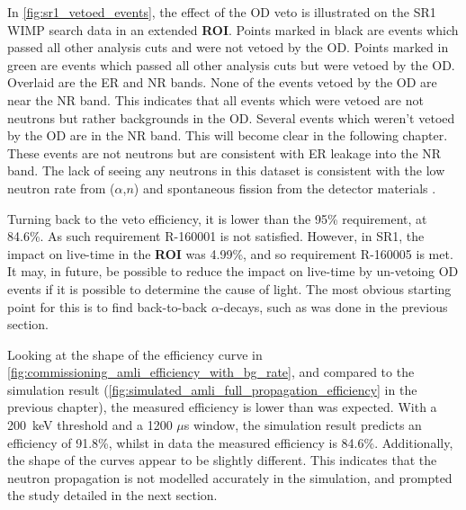 
%



\par
In \autoref{fig:sr1_vetoed_events}, the effect of the OD veto is illustrated on the SR1 WIMP search data in an extended \textbf{ROI}.
Points marked in black are events which passed all other analysis cuts and were not vetoed by the OD.
Points marked in green are events which passed all other analysis cuts but were vetoed by the OD.
Overlaid are the ER and NR bands.
None of the events vetoed by the OD are near the NR band.
This indicates that all events which were vetoed are not neutrons but rather backgrounds in the OD.
Several events which weren't vetoed by the OD are in the NR band.
This will become clear in the following chapter.
These events are not neutrons but are consistent with ER leakage into the NR band.
The lack of seeing any neutrons in this dataset is consistent with the low neutron rate from ($\alpha$,$n$) and spontaneous fission from the detector materials \cite{LZ_TechnicalDesignReview_ref}.



\par
Turning back to the veto efficiency, it is lower than the 95\% requirement, at 84.6\%.
As such requirement R-160001 is not satisfied.
However, in SR1, the impact on live-time in the \textbf{ROI} was 4.99\%, and so requirement R-160005 is met.
It may, in future, be possible to reduce the impact on live-time by un-vetoing OD events if it is possible to determine the cause of light.
The most obvious starting point for this is to find back-to-back $\alpha$-decays, such as was done in the previous section.

\par
Looking at the shape of the efficiency curve in \autoref{fig:commissioning_amli_efficiency_with_bg_rate}, and compared to the simulation result (\autoref{fig:simulated_amli_full_propagation_efficiency} in the previous chapter), the measured efficiency is lower than was expected.
With a 200~keV threshold and a 1200 $\mu$s window, the simulation result predicts an efficiency of 91.8\%, whilst in data the measured efficiency is 84.6\%.
Additionally, the shape of the curves appear to be slightly different.
This indicates that the neutron propagation is not modelled accurately in the simulation, and prompted the study detailed in the next section.

